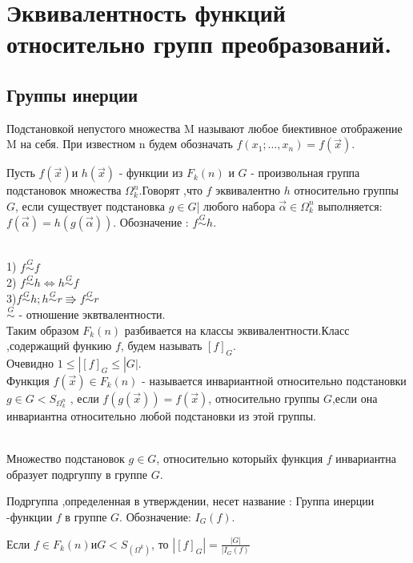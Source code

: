 \section{Эквивалентность функций относительно групп преобразований.}

\subsection{Группы инерции}

\opr 
Подстановкой непустого множества M называют любое биективное отображение M на себя. При известном n будем обозначать $f(x_1; \dotsc, x_n)=f(\vec{x})$.

\opr 
Пусть $f(\vec{x}) $и $h(\vec{x})$ - функции из $F_k(n)$ и $G$ - произвольная группа подстановок множества $\Omega_k^n$.Говорят ,что $f$ эквивалентно $h$ относительно группы $G$, если существует подстановка $g \in G $| любого набора $\vec{\alpha} \in \Omega_k^n$ выполняется: $f(\vec{\alpha})=h(g(\vec{\alpha}))$. Обозначение : $f \stackrel{G}{\sim} h$.
 
\utv \\
1) $f \stackrel{G}{\sim} f$ \\
2) $f \stackrel{G}{\sim} h \Leftrightarrow h \stackrel{G}{\sim} f$ \\
3)$f \stackrel{G}{\sim} h;h \stackrel{G}{\sim} r \Rrightarrow f \stackrel{G}{\sim} r$\\

$\stackrel{G}{\sim}$ - отношение эквтвалентности.\\

Таким образом $F_k(n) $ разбивается на классы эквивалентности.Класс ,содержащий функию $f$, будем называть $[f]_G$. \\
Очевидно $1\leq|[f]_G\leq|G|$.\\


\opr 
Функция $f(\vec{x}) \in F_k(n) $ - называется инвариантной относительно подстановки $g \in G < S_{\Omega_k^n}$ , если $f(g(\vec{x})) = f(\vec{x})$, относительно группы $G$,если она инвариантна относительно любой подстановки из этой группы.

\utv \\
Множество подстановок $g \in G$, относительно которыйх функция $f$ инвариантна образует подргуппу в группе $G$.

\opr 
Подргуппа ,определенная в утверждении, несет название : Группа инерции -функции $f$ в группе $G$. Обозначение: $I_G(f)$.

\thr 
Если $f\in F_k(n) и G<S_(\Omega^k)$, то $|[f]_G|=\frac{|G|}{|I_G(f)}$

